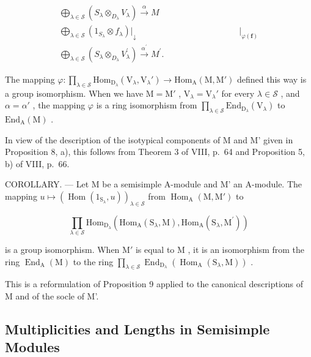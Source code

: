 \[
\begin{array}{c} \bigoplus_ {\lambda \in \mathscr {S}} (S _ {\lambda} \otimes_ {D _ {\lambda}} V _ {\lambda}) \xrightarrow {\alpha} M \\ \bigoplus_ {\lambda \in \mathscr {S}} (1 _ {S _ {\lambda}} \otimes f _ {\lambda}) \Bigg | _ {\downarrow} \qquad \qquad \qquad \qquad \qquad \qquad \Bigg | _ {\varphi (\boldsymbol {f})} \\ \bigoplus_ {\lambda \in \mathscr {S}} (S _ {\lambda} \otimes_ {D _ {\lambda}} V _ {\lambda} ^ {\prime}) \xrightarrow {\alpha^ {\prime}} M ^ {\prime}. \end{array}
\]

The mapping \(\varphi : \prod_{\lambda \in \mathcal{S}} \mathrm{Hom}_{\mathrm{D}_{\lambda}}(\mathrm{V}_{\lambda}, \mathrm{V}_{\lambda}') \to \mathrm{Hom}_{\mathrm{A}}(\mathrm{M}, \mathrm{M}')\) defined this way is a group isomorphism. When we have \(\mathrm{M} = \mathrm{M}'\) , \(\mathrm{V}_{\lambda} = \mathrm{V}_{\lambda}'\) for every \(\lambda \in \mathcal{S}\) , and \(\alpha = \alpha'\) , the mapping \(\varphi\) is a ring isomorphism from \(\prod_{\lambda \in \mathcal{S}} \mathrm{End}_{\mathrm{D}_{\lambda}}(\mathrm{V}_{\lambda})\) to \(\mathrm{End}_{\mathrm{A}}(\mathrm{M})\) .

In view of the description of the isotypical components of M and M' given in Proposition 8, a), this follows from Theorem 3 of VIII, p.~64 and Proposition 5, b) of VIII, p.~66.

COROLLARY. --- Let M be a semisimple A-module and M' an A-module. The mapping \(u \mapsto (\operatorname{Hom}(1_{\mathrm{S}_{\lambda}}, u))_{\lambda \in \mathcal{S}}\) from \(\operatorname{Hom}_{\mathrm{A}}(\mathrm{M}, \mathrm{M}')\) to

\[
\prod_ {\lambda \in \mathcal {S}} \mathrm{Hom} _ {\mathrm{D} _ {\lambda}} (\mathrm{Hom} _ {\mathrm{A}} (\mathrm{S} _ {\lambda}, \mathrm{M}), \mathrm{Hom} _ {\mathrm{A}} (\mathrm{S} _ {\lambda}, \mathrm{M} ^ {\prime}))
\]

is a group isomorphism. When \(\mathrm{M}'\) is equal to \(\mathrm{M}\) , it is an isomorphism from the ring \(\operatorname{End}_{\mathrm{A}}(\mathrm{M})\) to the ring \(\prod_{\lambda \in \mathcal{S}} \operatorname{End}_{\mathrm{D}_{\lambda}}(\operatorname{Hom}_{\mathrm{A}}(\mathrm{S}_{\lambda}, \mathrm{M}))\) .

This is a reformulation of Proposition 9 applied to the canonical descriptions of M and of the socle of M'.

\subsection{Multiplicities and Lengths in Semisimple Modules}

